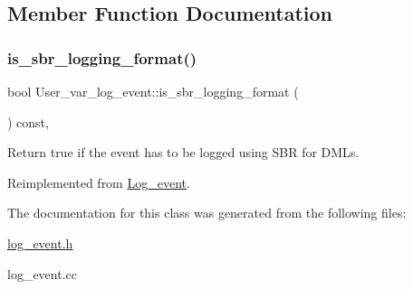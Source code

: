 \subsection{Member Function Documentation}
\mbox{\label{classUser__var__log__event_a324c3239a7fefb0ad5c0ae44984d1683}} 
\subsubsection{\texorpdfstring{is\+\_\+sbr\+\_\+logging\+\_\+format()}{is\_sbr\_logging\_format()}}
{\footnotesize\ttfamily bool User\+\_\+var\+\_\+log\+\_\+event\+::is\+\_\+sbr\+\_\+logging\+\_\+format (\begin{DoxyParamCaption}{ }\end{DoxyParamCaption}) const\hspace{0.3cm}{\ttfamily [inline]}, {\ttfamily [virtual]}}

Return true if the event has to be logged using S\+BR for D\+M\+Ls. 

Reimplemented from \mbox{\hyperlink{classLog__event_ad4d689d007b7c8f1b0d54e65d8f34069}{Log\+\_\+event}}.



The documentation for this class was generated from the following files\+:\begin{DoxyCompactItemize}
\item 
\mbox{\hyperlink{log__event_8h}{log\+\_\+event.\+h}}\item 
log\+\_\+event.\+cc\end{DoxyCompactItemize}
